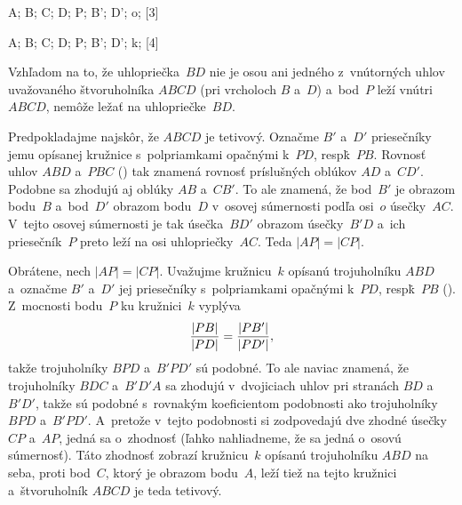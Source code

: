 {%
\fontplace
\rpoint A; \tpoint B; \lpoint C; \bpoint D;
\rpoint P; \tpoint B'; \bpoint D';
\lBpoint o;
[3] \hfil\Obr

\fontplace
\rpoint A; \tpoint B; \lpoint C; \bpoint D;
\rpoint P; \tpoint B'; \bpoint D';
\lpoint k;
[4] \hfil\Obr

\inspicture
Vzhľadom na to, že uhlopriečka~$BD$ nie je osou ani jedného
z~vnútorných uhlov uvažovaného štvoruholníka $ABCD$ (pri vrcholoch
$B$ a~$D$) a~bod~$P$ leží vnútri $ABCD$, nemôže ležať na
uhlopriečke~$BD$.

Predpokladajme najskôr, že $ABCD$ je tetivový. Označme $B'$ 
a~$D'$ priesečníky jemu opísanej kružnice s~polpriamkami opačnými k~$PD$,
resp\. k~$PB$. Rovnosť uhlov $ABD$ a~$PBC$ (\obr) tak znamená
rovnosť príslušných oblúkov $AD$ a~$CD'$. Podobne sa zhodujú 
aj oblúky $AB$ a~$CB'$. To ale znamená, že bod~$B'$ je obrazom bodu~$B$
a~bod~$D'$ obrazom bodu~$D$ v~osovej súmernosti podľa osi~$o$
úsečky~$AC$. V~tejto osovej súmernosti je tak úsečka~$BD'$ obrazom
úsečky~$B'D$ a~ich priesečník~$P$ preto leží na osi uhlopriečky~$AC$.
Teda $|AP|=|CP|$.

Obrátene, nech $|AP|=|CP|$. Uvažujme kružnicu~$k$ opísanú trojuholníku
$ABD$ a~označme $B'$ a~$D'$ jej priesečníky s~polpriamkami opačnými
\inspicture
k~$PD$, resp\. k~$PB$ (\obr). Z~mocnosti bodu~$P$ ku kružnici~$k$
vyplýva
$$
{|PB|\over|PD|}={|PB'|\over|PD'|},
$$
takže trojuholníky $BPD$ a~$B'PD'$ sú podobné. To ale naviac znamená,
že trojuholníky $BDC$ a~$B'D'A$ sa zhodujú v~dvojiciach uhlov pri
stranách $BD$ a~$B'D'$, takže sú podobné s~rovnakým koeficientom
podobnosti ako trojuholníky $BPD$ a~$B'PD'$. A~pretože v~tejto
podobnosti si zodpovedajú dve zhodné úsečky $CP$ a~$AP$, jedná sa
o~zhodnosť (ľahko nahliadneme, že sa jedná o~osovú súmernosť).
Táto zhodnosť zobrazí kružnicu~$k$ opísanú trojuholníku $ABD$ na seba,
proti bod~$C$, ktorý je obrazom bodu~$A$, leží tiež na tejto
kružnici a~štvoruholník $ABCD$ je teda tetivový.}

